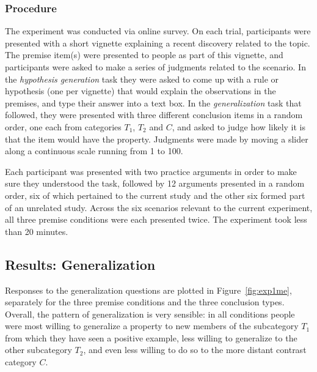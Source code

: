 \documentclass[authoryear,11pt]{elsarticle}
\begin{document}
\subsubsection{Procedure}

The experiment was conducted via online survey. On each trial, participants were presented with a short vignette explaining a recent discovery related to the topic. The premise item(s) were presented to people as part of this vignette, and participants were asked to make a series of judgments related to the scenario.  In the {\it hypothesis generation} task they were asked to come up with a rule or hypothesis (one per vignette) that would explain the observations in the premises, and type their answer into a text box. In the {\it generalization} task that followed, they were presented with three different conclusion items in a random order, one each from categories $T_1$, $T_2$ and $C$, and asked to judge how likely it is that the item would have the property. Judgments were made by moving a slider along a continuous scale running from 1 to 100.

Each participant was presented with two practice arguments in order to make sure they understood the task, followed by 12 arguments presented in a random order, six of which pertained to the current study and the other six formed part of an unrelated study. Across the six scenarios relevant to the current experiment, all three premise conditions were each presented twice. The experiment took less than 20 minutes.

\subsection{Results: Generalization}

Responses to the generalization questions are plotted in Figure~\ref{fig:exp1me}, separately for the three premise conditions and the three conclusion types. Overall, the pattern of generalization is very sensible: in all conditions people were most willing to generalize a property to new members of the subcategory $T_1$ from which they have seen a positive example, less willing to generalize to the other subcategory $T_2$, and even less willing to do so to the more distant contrast category $C$.
\end{document}
